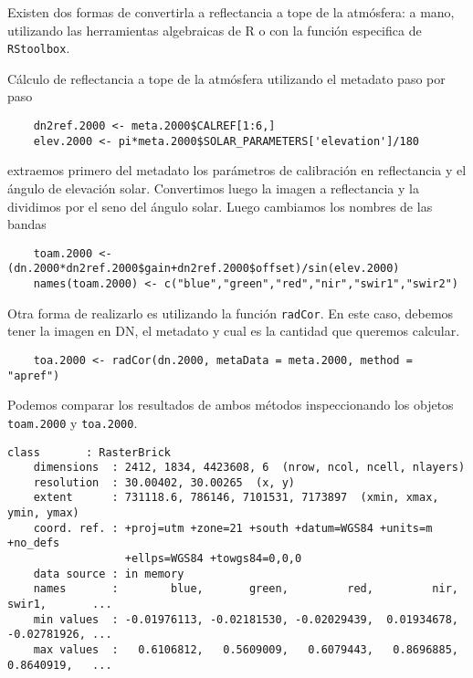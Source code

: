 Existen dos formas de convertirla a reflectancia a tope de la atm\'osfera: a mano,
utilizando las herramientas algebraicas de R o con la funci\'on
especifica de \texttt{RStoolbox}.

\begin{exa}
    C\'alculo de reflectancia a tope de la atm\'osfera
    utilizando el metadato paso por paso

    \begin{lstlisting}
    dn2ref.2000 <- meta.2000$CALREF[1:6,]
    elev.2000 <- pi*meta.2000$SOLAR_PARAMETERS['elevation']/180
    \end{lstlisting}
    extraemos primero del metadato los par\'ametros de calibraci\'on en
    reflectancia y el \'angulo de elevaci\'on solar. Convertimos luego la imagen
    a reflectancia y la dividimos por el seno del \'angulo solar.
    Luego cambiamos los nombres de las bandas

    \begin{lstlisting}
    toam.2000 <- (dn.2000*dn2ref.2000$gain+dn2ref.2000$offset)/sin(elev.2000)
    names(toam.2000) <- c("blue","green","red","nir","swir1","swir2")
    \end{lstlisting}

    Otra forma de realizarlo es utilizando la funci\'on
    \texttt{radCor}. En este caso, debemos tener la imagen en DN, el metadato y
    cual es la cantidad que queremos calcular.

    \begin{lstlisting}
    toa.2000 <- radCor(dn.2000, metaData = meta.2000, method = "apref")
    \end{lstlisting}

    Podemos comparar los resultados de ambos m\'etodos inspeccionando los objetos
    \texttt{toam.2000} y \texttt{toa.2000}.
    \begin{Verbatim}[fontsize=\small]
    class       : RasterBrick
    dimensions  : 2412, 1834, 4423608, 6  (nrow, ncol, ncell, nlayers)
    resolution  : 30.00402, 30.00265  (x, y)
    extent      : 731118.6, 786146, 7101531, 7173897  (xmin, xmax, ymin, ymax)
    coord. ref. : +proj=utm +zone=21 +south +datum=WGS84 +units=m +no_defs
                  +ellps=WGS84 +towgs84=0,0,0
    data source : in memory
    names       :        blue,       green,         red,         nir,    swir1,       ...
    min values  : -0.01976113, -0.02181530, -0.02029439,  0.01934678,    -0.02781926, ...
    max values  :   0.6106812,   0.5609009,   0.6079443,   0.8696885,    0.8640919,   ...
    \end{Verbatim}


\end{exa}
